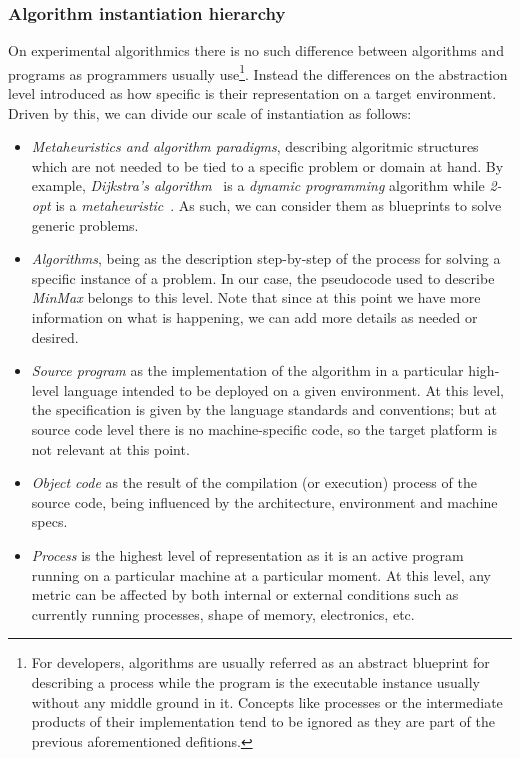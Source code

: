 \subsubsection{Algorithm instantiation hierarchy}
On experimental algorithmics there is no such difference between algorithms and programs as programmers usually use\footnote{For developers, algorithms are usually referred as an abstract blueprint for describing a process while the program is the executable instance usually without any middle ground in it. Concepts like processes or the intermediate products of their implementation tend to be ignored as they are part of the previous aforementioned defitions.}. Instead the differences on the abstraction level introduced as how specific is their representation on a target environment. Driven by this, we can divide our scale of instantiation as follows:
\begin{itemize}
    \item \textit{Metaheuristics and algorithm paradigms}, describing algoritmic structures which are not needed to be tied to a specific problem or domain at hand. By example, \textit{Dijkstra's algorithm}~\cite{10.5555/1614191} is a \emph{dynamic programming} algorithm while \textit{2-opt} is a \emph{metaheuristic}~\cite{10.2307/167074}. As such, we can consider them as blueprints to solve generic problems.
    \item \textit{Algorithms}, being as the description step-by-step of the process for solving a specific instance of a problem. In our case, the pseudocode used to describe \textit{MinMax} belongs to this level. Note that since at this point we have more information on what is happening, we can add more details as needed or desired.
    \item \textit{Source program} as the implementation of the algorithm in a particular high-level language intended to be deployed on a given environment. At this level, the specification is given by the language standards and conventions; but at source code level there is no machine-specific code, so the target platform is not relevant at this point.
    \item \textit{Object code} as the result of the compilation (or execution) process of the source code, being influenced by the architecture, environment and machine specs.
    \item \textit{Process} is the highest level of representation as it is an active program running on a particular machine at a particular moment. At this level, any metric can be affected by both internal or external conditions such as currently running processes, shape of memory, electronics, etc.
\end{itemize}

